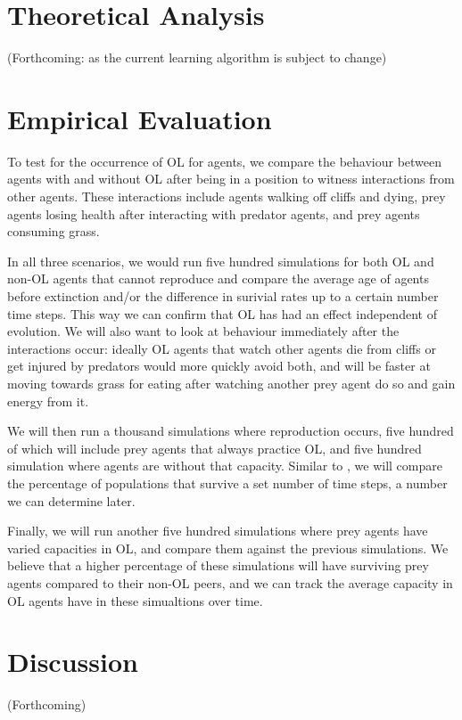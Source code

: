 \documentclass[letterpaper]{article}
\numberwithin{equation}{section}
\numberwithin{theorem}{section}
\numberwithin{lemma}{section}
\numberwithin{df}{section}
\begin{document}
\section{Theoretical Analysis}
(Forthcoming: as the current learning algorithm is subject to change)

\section{Empirical Evaluation}

To test for the occurrence of OL for agents, we compare the behaviour between agents with and without OL after being in a position to witness interactions from other agents.  These interactions include agents walking off cliffs and dying, prey agents losing health after interacting with predator agents, and prey agents consuming grass.  

In all three scenarios, we would run five hundred simulations for both OL and non-OL agents that cannot reproduce and compare the average age of agents before extinction and/or the difference in surivial rates up to a certain number time steps.  This way we can confirm that OL has had an effect independent of evolution.  We will also want to look at behaviour immediately after the interactions occur: ideally OL agents that watch other agents die from cliffs or get injured by predators would more quickly avoid both, and will be faster at moving towards grass for eating after watching another prey agent do so and gain energy from it.

We will then run a thousand simulations where reproduction occurs, five hundred of which will include prey agents that always practice OL, and five hundred simulation where agents are without that capacity. Similar to  \cite{ackley1991interactions}, we will compare the percentage of populations that survive a set number of time steps, a number we can determine later.

Finally, we will run another five hundred simulations where prey agents have varied capacities in OL, and compare them against the previous simulations.  We believe that a higher percentage of these simulations will have surviving prey agents compared to their non-OL peers, and we can track the average capacity in OL agents have in these simualtions over time.

\section{Discussion}
(Forthcoming)
\end{document}
